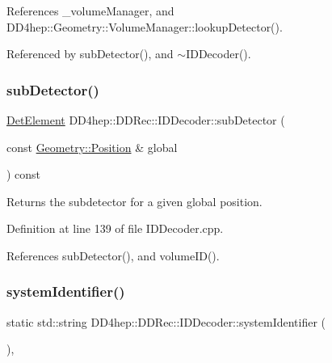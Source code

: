 References \+\_\+volume\+Manager, and D\+D4hep\+::\+Geometry\+::\+Volume\+Manager\+::lookup\+Detector().



Referenced by sub\+Detector(), and $\sim$\+I\+D\+Decoder().

\hypertarget{class_d_d4hep_1_1_d_d_rec_1_1_i_d_decoder_a053676aa5e152d800171dab3673cf258}{}\label{class_d_d4hep_1_1_d_d_rec_1_1_i_d_decoder_a053676aa5e152d800171dab3673cf258} 
\subsubsection{\texorpdfstring{sub\+Detector()}{subDetector()}\hspace{0.1cm}{\footnotesize\ttfamily [2/2]}}
{\footnotesize\ttfamily \hyperlink{class_d_d4hep_1_1_geometry_1_1_det_element}{Det\+Element} D\+D4hep\+::\+D\+D\+Rec\+::\+I\+D\+Decoder\+::sub\+Detector (\begin{DoxyParamCaption}\item[{const \hyperlink{namespace_d_d4hep_1_1_geometry_a55083902099d03506c6db01b80404900}{Geometry\+::\+Position} \&}]{global }\end{DoxyParamCaption}) const}



Returns the subdetector for a given global position. 



Definition at line 139 of file I\+D\+Decoder.\+cpp.



References sub\+Detector(), and volume\+I\+D().

\hypertarget{class_d_d4hep_1_1_d_d_rec_1_1_i_d_decoder_a11948929195ead4902e59730ad4a582f}{}\label{class_d_d4hep_1_1_d_d_rec_1_1_i_d_decoder_a11948929195ead4902e59730ad4a582f} 
\subsubsection{\texorpdfstring{system\+Identifier()}{systemIdentifier()}}
{\footnotesize\ttfamily static std\+::string D\+D4hep\+::\+D\+D\+Rec\+::\+I\+D\+Decoder\+::system\+Identifier (\begin{DoxyParamCaption}{ }\end{DoxyParamCaption})\hspace{0.3cm}{\ttfamily [inline]}, {\ttfamily [static]}}



